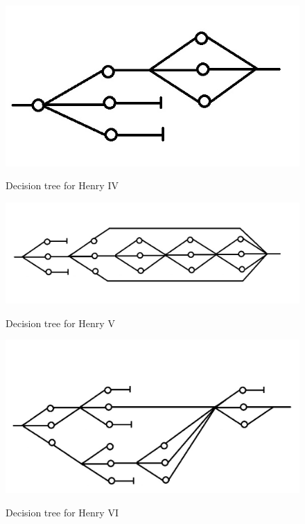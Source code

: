 \documentclass{scrreprt}
\begin{document}
\begin{figure}
	\includegraphics{Henry4Paint.jpg}
	\begin{center}
		Decision tree for Henry IV 
	\end{center}
\end{figure}

\begin{figure}
	\includegraphics[scale=0.8]{Henry5.jpg}
	\begin{center}
		Decision tree for Henry V 
	\end{center}
\end{figure}

\begin{figure}
	\includegraphics[scale=0.85]{Henry6.jpg}
	\begin{center}
		Decision tree for Henry VI 
	\end{center}
\end{figure}
\end{document}
